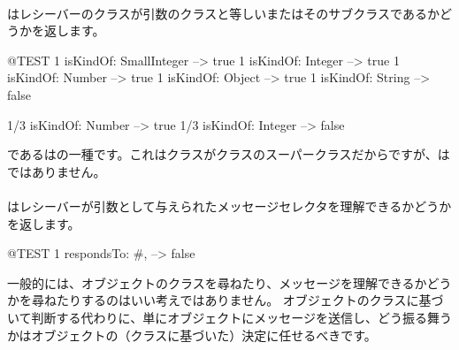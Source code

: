 \documentclass[a4paper,10pt,twoside]{book}
\begin{document}
\paragraph{}
 はレシーバーのクラスが引数のクラスと等しいまたはそのサブクラスであるかどうかを返します。

\begin{code}{@TEST}
1 isKindOf: SmallInteger --> true
1 isKindOf: Integer          --> true
1 isKindOf: Number         --> true
1 isKindOf: Object           --> true
1 isKindOf: String            --> false

1/3 isKindOf: Number      --> true
1/3 isKindOf: Integer        --> false
\end{code}

であるはの一種です。これはクラスがクラスのスーパークラスだからですが、はではありません。

\paragraph{}
はレシーバーが引数として与えられたメッセージセレクタを理解できるかどうかを返します。

\begin{code}{@TEST}
1 respondsTo: #, --> false
\end{code}

一般的には、オブジェクトのクラスを尋ねたり、メッセージを理解できるかどうかを尋ねたりするのはいい考えではありません。
オブジェクトのクラスに基づいて判断する代わりに、単にオブジェクトにメッセージを送信し、どう振る舞うかはオブジェクトの（クラスに基づいた）決定に任せるべきです。

\end{document}
